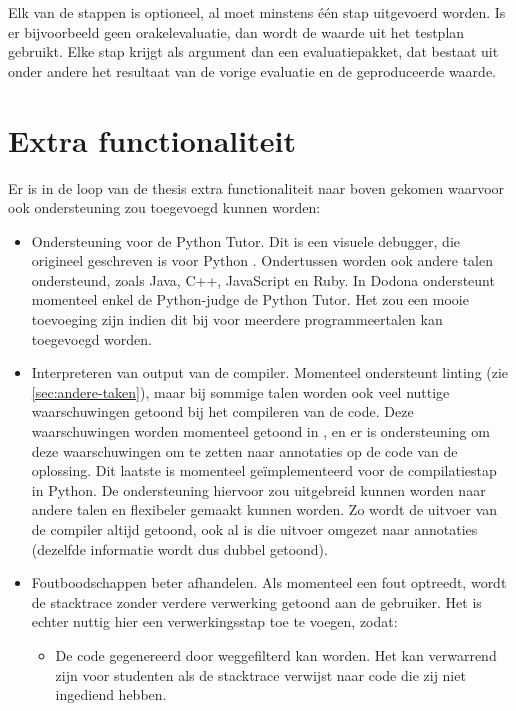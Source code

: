 Elk van de stappen is optioneel, al moet minstens één stap uitgevoerd worden.
Is er bijvoorbeeld geen orakelevaluatie, dan wordt de waarde uit het testplan gebruikt.
Elke stap krijgt als argument dan een evaluatiepakket, dat bestaat uit onder andere het resultaat van de vorige evaluatie en de geproduceerde waarde.

\section{Extra functionaliteit}\label{sec:kleinere-functies}

Er is in de loop van de thesis extra functionaliteit naar boven gekomen waarvoor ook ondersteuning zou toegevoegd kunnen worden:

\begin{itemize}
    \item Ondersteuning voor de Python Tutor.
    Dit is een visuele debugger, die origineel geschreven is voor Python \autocite{10.1145/2445196.2445368}.
    Ondertussen worden ook andere talen ondersteund, zoals Java, C++, JavaScript en Ruby.
    In Dodona ondersteunt momenteel enkel de Python-judge de Python Tutor.
    Het zou een mooie toevoeging zijn indien dit bij \tested{} voor meerdere programmeertalen kan toegevoegd worden.
    \item Interpreteren van output van de compiler.
    Momenteel ondersteunt \tested{} linting (zie \cref{sec:andere-taken}), maar bij sommige talen worden ook veel nuttige waarschuwingen getoond bij het compileren van de code.
    Deze waarschuwingen worden momenteel getoond in \tested{}, en er is ondersteuning om deze waarschuwingen om te zetten naar annotaties op de code van de oplossing.
    Dit laatste is momenteel geïmplementeerd voor de compilatiestap in Python.
    De ondersteuning hiervoor zou uitgebreid kunnen worden naar andere talen en flexibeler gemaakt kunnen worden.
    Zo wordt de uitvoer van de compiler altijd getoond, ook al is die uitvoer omgezet naar annotaties (dezelfde informatie wordt dus dubbel getoond).
    \item Foutboodschappen beter afhandelen.
    Als momenteel een fout optreedt, wordt de stacktrace zonder verdere verwerking getoond aan de gebruiker.
    Het is echter nuttig hier een verwerkingsstap toe te voegen, zodat:
    \begin{itemize}
        \item De code gegenereerd door \tested{} weggefilterd kan worden.
        Het kan verwarrend zijn voor studenten als de stacktrace verwijst naar code die zij niet ingediend hebben.

\end{itemize}
\end{itemize}
